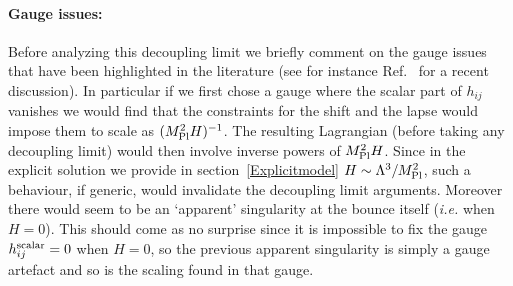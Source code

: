 \documentclass[12pt]{article}
\def\mpl{M_{\rm Pl}}
\def\ie{{\it i.e. }}
\begin{document}
\paragraph{Gauge issues:} Before analyzing this decoupling limit we briefly comment on the gauge issues that have been highlighted in the literature (see for instance Ref.~\cite{Koehn:2015vvy} for a recent discussion). In particular if we first chose a gauge where the scalar part of  $h_{ij}$ vanishes we would find that the constraints for the shift and the lapse would impose them to scale as $(\mpl^2 H)^{-1}$. The resulting Lagrangian (before taking any decoupling limit) would then involve inverse powers of $\mpl^2 H$. Since in the explicit solution we provide in section~\ref{Explicitmodel} $H\sim \Lambda^3/\mpl^2$, such a behaviour, if generic, would invalidate the decoupling limit arguments. Moreover there would seem to be an `apparent' singularity at the bounce itself (\ie when $H=0$). This should come as no surprise since it is  impossible to fix the gauge $h_{ij}^{\rm scalar}=0$ when $H=0$, so the previous apparent singularity is simply a gauge artefact and so is the scaling found in that gauge. \\
\end{document}
